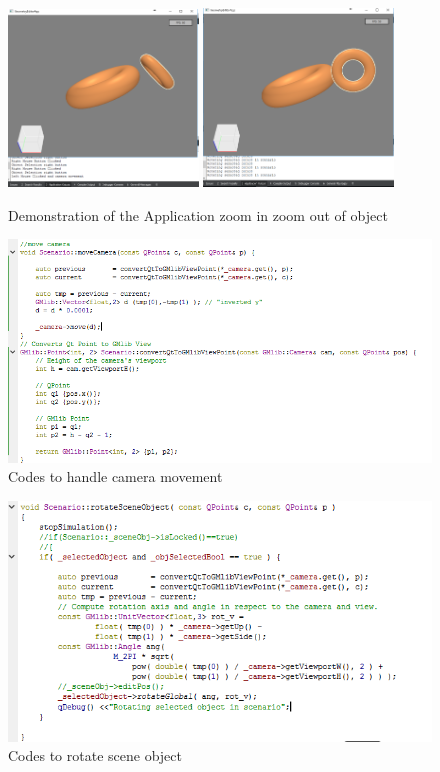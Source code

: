 \documentclass[a4,10pt]{article}
\begin{document}
\begin{figure}[]
  \centering
  \includegraphics[width=0.45\textwidth]{gfx/rotate1.png}
\includegraphics[width=0.45\textwidth]{gfx/rotate2.png}
\caption{Demonstration of the Application zoom in zoom out of object}
\end{figure}
\begin{figure}[]
  \centering
  \includegraphics[width=1\textwidth]{gfx/movecamera.png}
  \caption{Codes to handle camera movement}
  \label{fig:movecamera}
\end{figure}
\begin{figure}[]
\centering
\includegraphics[width=1\textwidth]{gfx/rotateobject.png}
\caption{Codes to rotate scene object}
\label{fig:rotateobject}
\end{figure}
\end{document}
